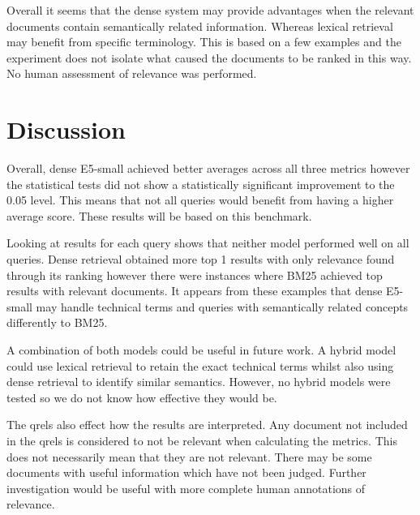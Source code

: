 \documentclass[10pt]{article}
\begin{document}
Overall it seems that the dense system may provide advantages when the relevant documents contain semantically related information. Whereas lexical retrieval may benefit from specific terminology. This is based on a few examples and the experiment does not isolate what caused the documents to be ranked in this way. No human assessment of relevance was performed.

\section{Discussion}
Overall, dense E5-small achieved better averages across all three metrics however the statistical tests did not show a statistically significant improvement to the 0.05 level. This means that not all queries would benefit from having a higher average score. These results will be based on this benchmark.

Looking at results for each query shows that neither model performed well on all queries. Dense retrieval obtained more top 1 results with only relevance found through its ranking however there were instances where BM25 achieved top results with relevant documents. It appears from these examples that dense E5-small may handle technical terms and queries with semantically related concepts differently to BM25.

A combination of both models could be useful in future work. A hybrid model could use lexical retrieval to retain the exact technical terms whilst also using dense retrieval to identify similar semantics. However, no hybrid models were tested so we do not know how effective they would be.

The qrels also effect how the results are interpreted. Any document not included in the qrels is considered to not be relevant when calculating the metrics. This does not necessarily mean that they are not relevant. There may be some documents with useful information which have not been judged. Further investigation would be useful with more complete human annotations of relevance.
\end{document}
